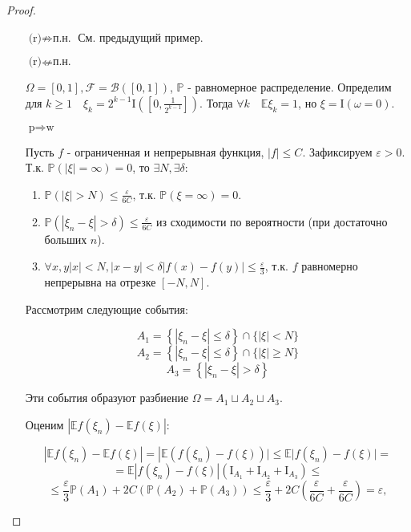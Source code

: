 \begin{proof}
\begin{itemize}
    \item[$\text{(r)} \nRightarrow \text{п.н.}$] См. предыдущий пример.
    
    \item[$\text{(r)} \nLeftarrow \text{п.н.}$]
    
    $\Omega = [0,1], \mathcal{F} = \mathcal{B}([0,1])$, $\mathbb{P}$ - равномерное распределение. Определим для $k \geqslant 1 \quad \xi_k = 2^{k-1} \mathrm{I}\left(\left[0, \frac{1}{2^{k-1}}\right]\right).$ Тогда $\forall k \quad \mathbb{E}\xi_k = 1$, но $\xi = \mathrm{I}(\omega = 0)$.
    
    \item[$\text{p} \Rightarrow \text{w}$]
    
    Пусть $f$ - ограниченная и непрерывная функция, $|f| \leqslant C$. Зафиксируем $\varepsilon > 0$. Т.к. $\mathbb{P}(|\xi| = \infty) = 0$, то $\exists N, \exists \delta$:
    
    \begin{enumerate}
        \item $\mathbb{P}(|\xi| > N) \leqslant \frac{\varepsilon}{6C}$, т.к. $\mathbb{P}(\xi = \infty) = 0$.
        \item $\mathbb{P}(|\xi_n - \xi| > \delta) \leqslant \frac{\varepsilon}{6C}$ из сходимости по вероятности (при достаточно больших $n$).
        \item $\forall x,y |x| < N, |x - y| < \delta|f(x) - f(y)| \leqslant \frac{\varepsilon}{3}$, т.к. $f$ равномерно непрерывна на отрезке $[-N, N]$.
    \end{enumerate}
    
    Рассмотрим следующие события:
    
    $$ A_{1}=\left\{\left|\xi_{n}-\xi\right| \leqslant \delta\right\} \cap\{|\xi|<N\} $$
    $$ A_{2}=\left\{\left|\xi_{n}-\xi\right| \leqslant \delta\right\} \cap\{|\xi| \geqslant N\} $$
    $$ A_{3}=\left\{\left|\xi_{n}-\xi\right|>\delta\right\} $$
    
    Эти события образуют разбиение $\Omega=A_{1} \sqcup A_{2} \sqcup A_{3} $. 
    
    Оценим $|\mathbb{E}f(\xi_n) - \mathbb{E}f(\xi)|$:
    
    $$\left|\mathbb{E} f\left(\xi_{n}\right)-\mathbb{E} f(\xi)\right|=\left|\mathbb{E}\left(f\left(\xi_{n}\right)-f(\xi)\right)|\leqslant 
    \mathbb{E}| f\left(\xi_{n}\right)-f(\xi) |=\right.$$
    $$=\mathbb{E}\left|f\left(\xi_{n}\right)-f(\xi)\right|\left(\mathrm{I}_{A_{1}}+\mathrm{I}_{A_{2}}+\mathrm{I}_{A_{3}}\right) \leq$$
    $$\leqslant \frac{\varepsilon}{3} \mathbb{P}\left(A_{1}\right)+2 C\left(\mathbb{P}\left(A_{2}\right)+\mathbb{P}\left(A_{3}\right)\right) \leqslant \frac{\varepsilon}{3}+2 C\left(\frac{\varepsilon}{6 C}+\frac{\varepsilon}{6 C}\right)=\varepsilon,$$
    

\end{itemize}
\end{proof}
